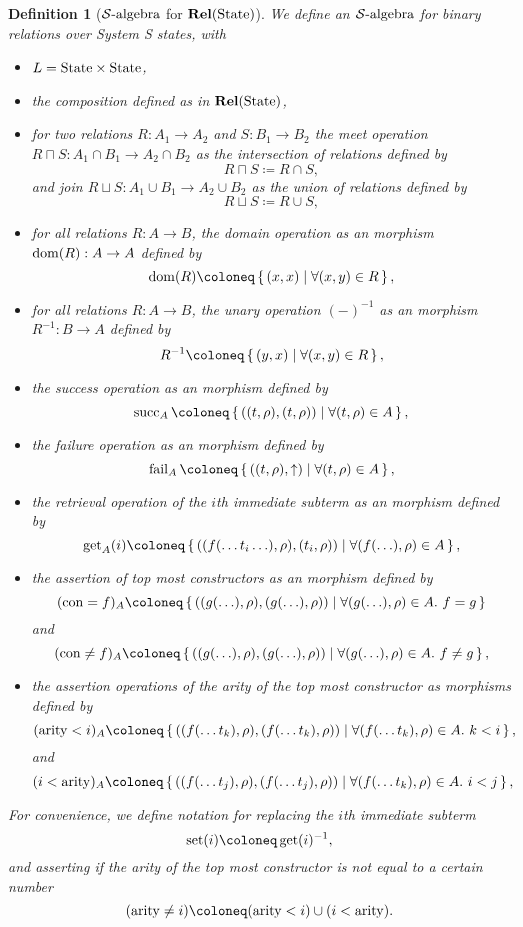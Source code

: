 \documentclass{article}
\newtheorem{definition}[theorem]{Definition}
\newcommand{\fail}{\ensuremath \text{$\uparrow$}}
\newcommand{\State}{\ensuremath \text{State}}
\newcommand{\setbuild}[2]{\ensuremath \left\{\, #1 \mid #2 \,\right\}}
\newcommand{\Rel}{\ensuremath \mathbf{Rel}}
\newcommand{\Salgebra}{\ensuremath \mathcal{S}\text{-algebra}}
\newcommand{\domain}{\ensuremath \operatorname{dom}}
\newcommand{\lfail}{\ensuremath \operatorname{fail}}
\newcommand{\lsucc}{\ensuremath \operatorname{succ}}
\newcommand{\set}{\ensuremath \operatorname{set}}
\newcommand{\get}{\ensuremath \operatorname{get}}
\newcommand{\arity}{\ensuremath \operatorname{arity}}
\newcommand{\constructor}{\ensuremath \operatorname{con}}
\begin{document}
\begin{definition}[$\Salgebra$ for $\Rel(\State)$] \normalfont
  We define an $\Salgebra$ for binary relations over System S states, with 
  \begin{itemize}
    \item $L = \State \times \State$,
    \item the composition defined as in $\Rel(\State)$,
    \item for two relations $R : A_1 \rightarrow A_2$ and $S : B_1 \rightarrow B_2$ the meet operation $R \sqcap S : A_1 \cap B_1 \rightarrow A_2 \cap B_2$ as the intersection of relations defined by \[R \sqcap S \coloneq R \cap S, \] and join $R \sqcup S : A_1 \cup B_1 \rightarrow A_2 \cup B_2$ as the union of relations defined by \[ R \sqcup S \coloneq R \cup S, \]
    \item for all relations $R : A \rightarrow B$, the domain operation as an morphism $\domain(R) : A \rightarrow A $ defined by \[ \domain(R) \coloneq \setbuild{ (x,x) }{ \forall (x,y) \in R }, \]
    \item for all relations $R : A \rightarrow B$, the unary operation $(-)^{-1}$ as an morphism $R^{-1} : B \rightarrow A $ defined by \[ R^{-1} \coloneq \setbuild{ (y,x) }{ \forall (x,y) \in R }, \]
    \item the \emph{success} operation as an morphism defined by \[\lsucc_A \coloneq \setbuild{((t,\rho),(t,\rho))}{ \forall (t,\rho) \in A }, \]
    \item the \emph{failure} operation as an morphism defined by \[ \lfail_A \coloneq \setbuild{((t,\rho),\fail)}{ \forall (t,\rho) \in A }, \]
    \item the retrieval operation of the $i$th immediate subterm as an morphism defined by \[ \get_A(i) \coloneq \setbuild{ ((f(\ldots t_i \ldots),\rho), (t_i,\rho)) }{ \forall (f(\ldots),\rho) \in A }, \]
    \item the assertion of top most constructors as an morphism defined by \[ (\constructor = f)_A \coloneq \setbuild{ ((g(\ldots),\rho),(g(\ldots),\rho)) }{ \forall (g(\ldots),\rho) \in A.\ f = g } \] and \[ (\constructor \neq f)_A \coloneq \setbuild{ ((g(\ldots),\rho),(g(\ldots),\rho)) }{ \forall (g(\ldots),\rho) \in A.\ f \neq g }, \]
    \item the assertion operations of the arity of the top most constructor as morphisms defined by \[ (\arity < i)_A \coloneq \setbuild{ ((f(\ldots t_k),\rho),(f(\ldots t_k),\rho)) }{ \forall (f(\ldots t_k),\rho) \in A.\ k < i }, \] and \[ (i < \arity)_A \coloneq \setbuild{ ((f(\ldots t_j),\rho),(f(\ldots t_j),\rho)) }{ \forall (f(\ldots t_k),\rho) \in A.\ i < j }, \]
  \end{itemize}

  For convenience, we define notation for replacing the $i$th immediate subterm  
  \[ \set(i) \coloneq \get(i)^{-1}, \] and asserting if the arity of the top most constructor is not equal to a certain number \[ (\arity \neq i) \coloneq (\arity < i) \cup (i < \arity). \]
\end{definition}
\end{document}
